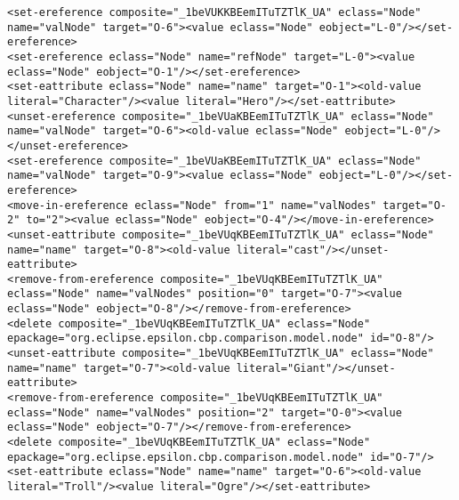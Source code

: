 \begin{lstlisting}[style=cbpfile,caption={Change-based representation of the model in Figure \ref{fig:class_diagram_left}.},label=lst:class_diagram_left_cbpfile]
<set-ereference composite="_1beVUKKBEemITuTZTlK_UA" eclass="Node" name="valNode" target="O-6"><value eclass="Node" eobject="L-0"/></set-ereference>
<set-ereference eclass="Node" name="refNode" target="L-0"><value eclass="Node" eobject="O-1"/></set-ereference>
<set-eattribute eclass="Node" name="name" target="O-1"><old-value literal="Character"/><value literal="Hero"/></set-eattribute>
<unset-ereference composite="_1beVUaKBEemITuTZTlK_UA" eclass="Node" name="valNode" target="O-6"><old-value eclass="Node" eobject="L-0"/></unset-ereference>
<set-ereference composite="_1beVUaKBEemITuTZTlK_UA" eclass="Node" name="valNode" target="O-9"><value eclass="Node" eobject="L-0"/></set-ereference>
<move-in-ereference eclass="Node" from="1" name="valNodes" target="O-2" to="2"><value eclass="Node" eobject="O-4"/></move-in-ereference>
<unset-eattribute composite="_1beVUqKBEemITuTZTlK_UA" eclass="Node" name="name" target="O-8"><old-value literal="cast"/></unset-eattribute>
<remove-from-ereference composite="_1beVUqKBEemITuTZTlK_UA" eclass="Node" name="valNodes" position="0" target="O-7"><value eclass="Node" eobject="O-8"/></remove-from-ereference>
<delete composite="_1beVUqKBEemITuTZTlK_UA" eclass="Node" epackage="org.eclipse.epsilon.cbp.comparison.model.node" id="O-8"/>
<unset-eattribute composite="_1beVUqKBEemITuTZTlK_UA" eclass="Node" name="name" target="O-7"><old-value literal="Giant"/></unset-eattribute>
<remove-from-ereference composite="_1beVUqKBEemITuTZTlK_UA" eclass="Node" name="valNodes" position="2" target="O-0"><value eclass="Node" eobject="O-7"/></remove-from-ereference>
<delete composite="_1beVUqKBEemITuTZTlK_UA" eclass="Node" epackage="org.eclipse.epsilon.cbp.comparison.model.node" id="O-7"/>
<set-eattribute eclass="Node" name="name" target="O-6"><old-value literal="Troll"/><value literal="Ogre"/></set-eattribute>
\end{lstlisting}
